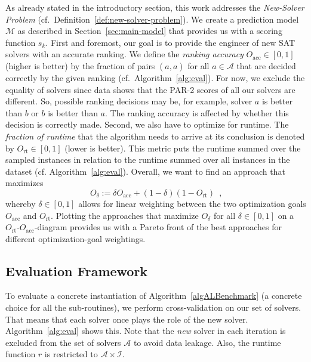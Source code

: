 \documentclass[runningheads]{llncs}
\begin{document}
As already stated in the introductory section, this work addresses the \emph{New-Solver Problem} (cf.~Definition~\ref{def:new-solver-problem}).
We create a prediction model $\mathcal{M}$ as described in Section~\ref{sec:main-model} that provides us with a scoring function $s_k$.
First and foremost, our goal is to provide the engineer of new SAT solvers with an accurate ranking.
We define the \emph{ranking accuracy} $O_{\operatorname{acc}} \in \left[0, 1\right]$ (higher is better) by the fraction of pairs $\left(\hat{a}, a\right)$ for all $a \in \mathcal{A}$ that are decided correctly by the given ranking (cf.~Algorithm~\ref{alg:eval}).
For now, we exclude the equality of solvers since data shows that the PAR-2 scores of all our solvers are different.
So, possible ranking decisions may be, for example, solver $a$ is better than $b$ or $b$ is better than $a$.
The ranking accuracy is affected by whether this decision is correctly made.
Second, we also have to optimize for runtime.
The \emph{fraction of runtime} that the algorithm needs to arrive at its conclusion is denoted by $O_{\operatorname{rt}} \in \left[0, 1\right]$ (lower is better).
This metric puts the runtime summed over the sampled instances in relation to the runtime summed over all instances in the dataset (cf. Algorithm~\ref{alg:eval}).
Overall, we want to find an approach that maximizes
%
\begin{equation}
  O_\delta := \delta O_{\operatorname{acc}} + \left(1 - \delta\right) \left(1 - O_{\operatorname{rt}}\right) \enspace \textrm{,}
  \label{eq:opt}
\end{equation} 
%
whereby $\delta \in \left[0, 1\right]$ allows for linear weighting between the two optimization goals $O_{\operatorname{acc}}$ and $O_{\operatorname{rt}}$.
Plotting the approaches that maximize $O_\delta$ for all $\delta \in \left[0, 1\right]$ on a $O_{\operatorname{rt}}$-$O_{\operatorname{acc}}$-diagram provides us with a Pareto front of the best approaches for different optimization-goal weightings.

\subsection{Evaluation Framework}
\label{sec:evalframe}

To evaluate a concrete instantiation of Algorithm~\ref{algALBenchmark} (a concrete choice for all the sub-routines), we perform cross-validation on our set of solvers.
That means that each solver once plays the role of the new solver.
Algorithm~\ref{alg:eval} shows this.
Note that the \emph{new} solver in each iteration is excluded from the set of solvers $\mathcal{A}$ to avoid data leakage.
Also, the runtime function $r$ is restricted to $\mathcal{A} \times \mathcal{I}$.
\end{document}
